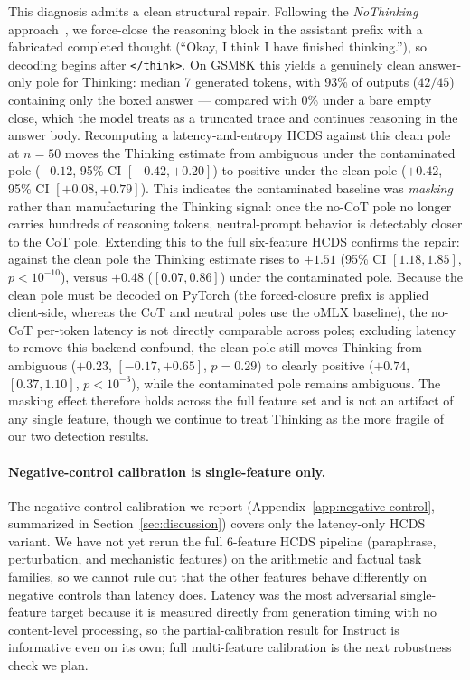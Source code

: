 \documentclass{article}
\theoremstyle{plain}
\theoremstyle{definition}
\theoremstyle{remark}
\begin{document}
This diagnosis admits a clean structural repair. Following the \emph{NoThinking} approach~\citep{ma2025nothinking}, we force-close the reasoning block in the assistant prefix with a fabricated completed thought (``Okay, I think I have finished thinking.''), so decoding begins after \texttt{\textless/think\textgreater}. On GSM8K this yields a genuinely clean answer-only pole for Thinking: median 7 generated tokens, with 93\% of outputs ($42/45$) containing only the boxed answer --- compared with 0\% under a bare empty close, which the model treats as a truncated trace and continues reasoning in the answer body. Recomputing a latency-and-entropy HCDS against this clean pole at $n=50$ moves the Thinking estimate from ambiguous under the contaminated pole ($-0.12$, 95\% CI $[-0.42, +0.20]$) to positive under the clean pole ($+0.42$, 95\% CI $[+0.08, +0.79]$). This indicates the contaminated baseline was \emph{masking} rather than manufacturing the Thinking signal: once the no-CoT pole no longer carries hundreds of reasoning tokens, neutral-prompt behavior is detectably closer to the CoT pole. Extending this to the full six-feature HCDS confirms the repair: against the clean pole the Thinking estimate rises to $+1.51$ (95\% CI $[1.18, 1.85]$, $p < 10^{-10}$), versus $+0.48$ ($[0.07, 0.86]$) under the contaminated pole. Because the clean pole must be decoded on PyTorch (the forced-closure prefix is applied client-side, whereas the CoT and neutral poles use the oMLX baseline), the no-CoT per-token latency is not directly comparable across poles; excluding latency to remove this backend confound, the clean pole still moves Thinking from ambiguous ($+0.23$, $[-0.17, +0.65]$, $p = 0.29$) to clearly positive ($+0.74$, $[0.37, 1.10]$, $p < 10^{-3}$), while the contaminated pole remains ambiguous. The masking effect therefore holds across the full feature set and is not an artifact of any single feature, though we continue to treat Thinking as the more fragile of our two detection results.

\paragraph{Negative-control calibration is single-feature only.}
The negative-control calibration we report (Appendix~\ref{app:negative-control}, summarized in Section~\ref{sec:discussion}) covers only the latency-only HCDS variant. We have not yet rerun the full 6-feature HCDS pipeline (paraphrase, perturbation, and mechanistic features) on the arithmetic and factual task families, so we cannot rule out that the other features behave differently on negative controls than latency does. Latency was the most adversarial single-feature target because it is measured directly from generation timing with no content-level processing, so the partial-calibration result for Instruct is informative even on its own; full multi-feature calibration is the next robustness check we plan.
\end{document}
